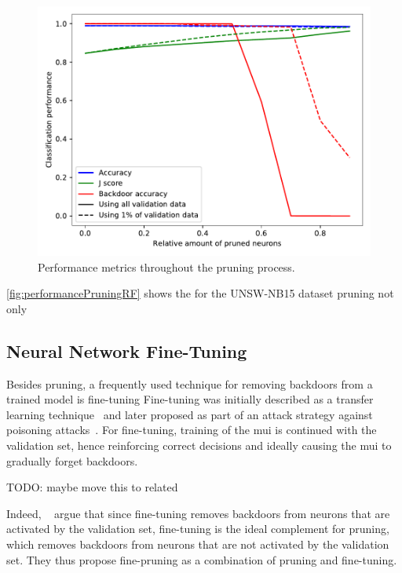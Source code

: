 \documentclass[10pt,sigconf,letterpaper,dvipsnames]{acmart}
\newcommand\note[2]{{\color{#1}#2}}
\newcommand\todo[1]{{\note{red}{TODO: #1}}}
\begin{document}
\begin{figure}[h]
\includegraphics[width=\columnwidth]{../prune_CAIA_backdoor_15/prune.pdf}
\caption{Performance metrics throughout the pruning process. }
\label{fig:performancePruningRF}
\end{figure}

\autoref{fig:performancePruningRF} shows the for the UNSW-NB15 dataset pruning not only 

\subsection{Neural Network Fine-Tuning}
Besides pruning, a frequently used technique for removing backdoors from a trained model is fine-tuning Fine-tuning was initially described as a transfer learning technique~\cite{yosinski_how_2014} and later proposed as part of an attack strategy against poisoning attacks~\cite{liu_fine-pruning:_2018}. For fine-tuning, training of the \gls{mui} is continued with the validation set, hence reinforcing correct decisions and ideally causing the \gls{mui} to gradually forget backdoors.

\todo{maybe move this to related}

Indeed, \citeauthor{liu_fine-pruning:_2018}~\cite{liu_fine-pruning:_2018} argue  that since fine-tuning removes backdoors from neurons that are activated by the validation set, fine-tuning is the ideal complement for pruning, which removes backdoors from neurons that are not activated by the validation set. They thus propose fine-pruning as a combination of pruning and fine-tuning.
\end{document}

